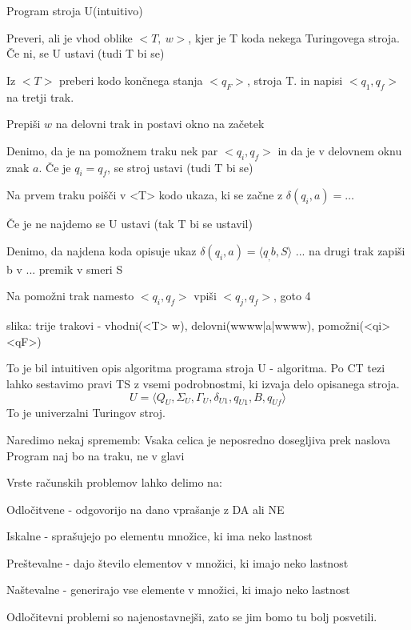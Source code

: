 \documentclass[10pt,a4paper,oneside]{book}
\begin{document}
Program stroja U(intuitivo)
\begin{items}
\item Preveri, ali je vhod oblike $<T,\ w>$, kjer je T koda nekega Turingovega stroja. Če ni, se U ustavi (tudi T bi se)
\item Iz $<T>$ preberi kodo končnega stanja $<q_F>$, stroja T. in napisi $<q_1, q_f>$ na tretji trak.
\item Prepiši $w$ na delovni trak in postavi okno na začetek 
\item Denimo, da je na pomožnem traku nek par $<q_i, q_f>$ in da je v delovnem oknu znak $a$. Če je $q_i=q_f$, se stroj ustavi (tudi T bi se)
\item Na prvem traku poišči v <T> kodo ukaza, ki se začne z $\delta(q_i, a)=\dots$
\item Če je ne najdemo se U ustavi (tak T bi se ustavil)
\item Denimo, da najdena koda opisuje ukaz $\delta(q_i, a)=\langle q_, b, S \rangle$ ... na drugi trak zapiši b v ... premik v smeri S
\item Na pomožni trak namesto $<q_i,q_f>$ vpiši $<q_j,q_f>$, goto 4
\end{items}
\fixme slika: trije trakovi - vhodni(<T> w), delovni(wwww|a|wwww), pomožni(<qi><qF>)

To je bil intuitiven opis algoritma programa stroja U - algoritma. Po CT tezi lahko sestavimo pravi TS z vsemi podrobnostmi, ki izvaja delo opisanega stroja.
\[U=\langle Q_U,\Sigma_U,\Gamma_U,\delta_{U1},q_{U1},B,q_{Uf} \rangle  \]
To je univerzalni Turingov stroj.

Naredimo nekaj sprememb:
Vsaka celica je neposredno dosegljiva prek naslova
Program naj bo na traku, ne v glavi

Vrste računskih problemov lahko delimo na:
\begin{items}
\item Odločitvene - odgovorijo na dano vprašanje z DA ali NE %
\item Iskalne - sprašujejo po elementu množice, ki ima neko lastnost
\item Preštevalne - dajo število elementov v množici, ki imajo neko lastnost
\item Naštevalne - generirajo vse elemente v množici, ki imajo neko lastnost
\end{items}
Odločitevni problemi so najenostavnejši, zato se jim bomo tu bolj posvetili.
\end{document}
